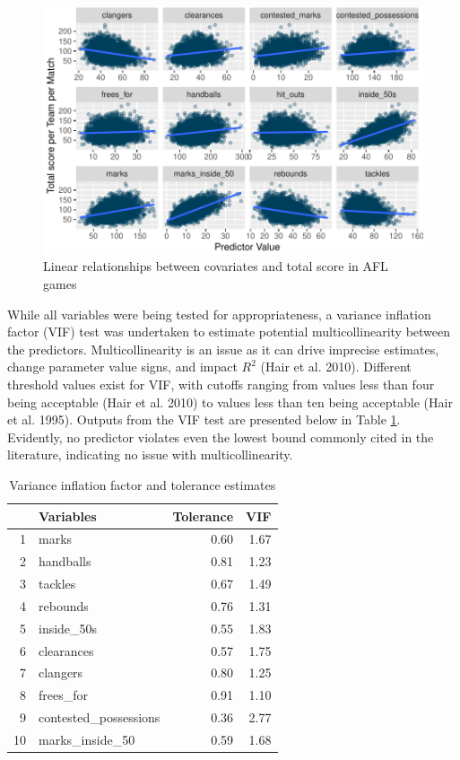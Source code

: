 \documentclass{article}
\begin{document}
\begin{figure}
\centering
\includegraphics{OLET5608_TrentHenderson_files/figure-latex/unnamed-chunk-4-1.pdf}
\caption{\label{fig:unnamed-chunk-4}Linear relationships between covariates and total score in AFL games}
\end{figure}

While all variables were being tested for appropriateness, a variance inflation factor (VIF) test was undertaken to estimate potential multicollinearity between the predictors. Multicollinearity is an issue as it can drive imprecise estimates, change parameter value signs, and impact \(R^2\) (Hair et al. 2010). Different threshold values exist for VIF, with cutoffs ranging from values less than four being acceptable (Hair et al. 2010) to values less than ten being acceptable (Hair et al. 1995). Outputs from the VIF test are presented below in Table \ref{tab:vif}. Evidently, no predictor violates even the lowest bound commonly cited in the literature, indicating no issue with multicollinearity.

\begin{table}[ht]
\centering
\begin{tabular}{rlrr}
  \hline
 & Variables & Tolerance & VIF \\ 
  \hline
1 & marks & 0.60 & 1.67 \\ 
  2 & handballs & 0.81 & 1.23 \\ 
  3 & tackles & 0.67 & 1.49 \\ 
  4 & rebounds & 0.76 & 1.31 \\ 
  5 & inside\_50s & 0.55 & 1.83 \\ 
  6 & clearances & 0.57 & 1.75 \\ 
  7 & clangers & 0.80 & 1.25 \\ 
  8 & frees\_for & 0.91 & 1.10 \\ 
  9 & contested\_possessions & 0.36 & 2.77 \\ 
  10 & marks\_inside\_50 & 0.59 & 1.68 \\ 
   \hline
\end{tabular}
\caption{Variance inflation factor and tolerance estimates} 
\label{tab:vif}
\end{table}
\end{document}
